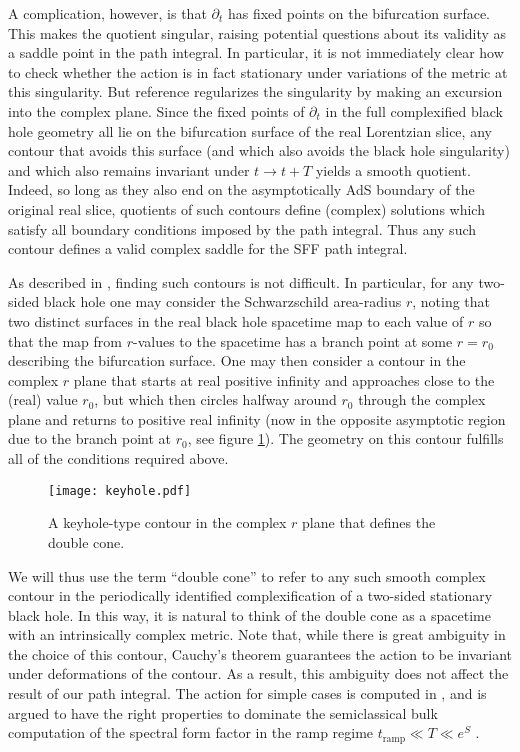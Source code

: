 \documentclass[11pt]{article}
\begin{document}
A complication, however, is that $\partial_t$ has fixed points on the bifurcation surface.  
This makes the quotient singular, raising potential questions about its validity as a saddle point in the path integral.  
In particular, it is not immediately clear how to check whether the action is in fact stationary under variations of the metric at this singularity. 
But reference \cite{SSS-1} regularizes the singularity by making an excursion into the complex plane.  
Since the fixed points of $\partial_t$ in the full complexified black hole geometry all lie on the bifurcation surface of the real Lorentzian slice, any contour that avoids this surface (and which also avoids the black hole singularity) and which also remains invariant under $t \rightarrow t+T$ yields a smooth quotient. 
Indeed, so long as they also end on the asymptotically AdS boundary of the original real slice, quotients of such contours define (complex) solutions which satisfy all boundary conditions imposed by the path integral.  
Thus any such contour defines a valid complex saddle for the SFF path integral.

As described in \cite{SSS-1}, finding such contours is not difficult.  
In particular, for any two-sided black hole one may consider the Schwarzschild area-radius $r$, noting that two distinct surfaces in the real black hole spacetime map to each value of $r$ so that the map from $r$-values to the spacetime has a branch point at some $r=r_0$ describing the bifurcation surface.  
One may then consider a contour in the complex $r$ plane that starts at real positive infinity and approaches close to the (real) value $r_0$, but which then circles halfway around $r_0$ through the complex plane and returns to positive real infinity (now in the opposite asymptotic region due to the branch point at $r_0$, see figure \ref{fig:sub1}).
The geometry on this contour fulfills all of the conditions required above.
\begin{figure}[htb]
    \centering
    \texttt{[image: keyhole.pdf]}
    \caption{A keyhole-type contour in the complex $r$ plane that defines the double cone.}
    \label{fig:sub1}
\end{figure}


We will thus use the term ``double cone'' to refer to any such smooth complex contour in the periodically identified complexification of a two-sided stationary black hole.  
In this way, it is natural to think of the double cone as a spacetime with an intrinsically complex metric.  
Note that, while there is great ambiguity in the choice of this contour, Cauchy's theorem guarantees the action to be invariant under deformations of the contour.  
As a result, this ambiguity does not affect the result of our path integral.  
The action for simple cases is computed in \cite{SSS-1,Saad:2019lba,Stanford:2019vob}, and is argued to have the right properties to dominate the semiclassical bulk computation of the spectral form factor in the ramp regime $t_{\text{ramp}} \ll T \ll e^S$ \cite{Gharibyan:2018jrp}.
\end{document}
